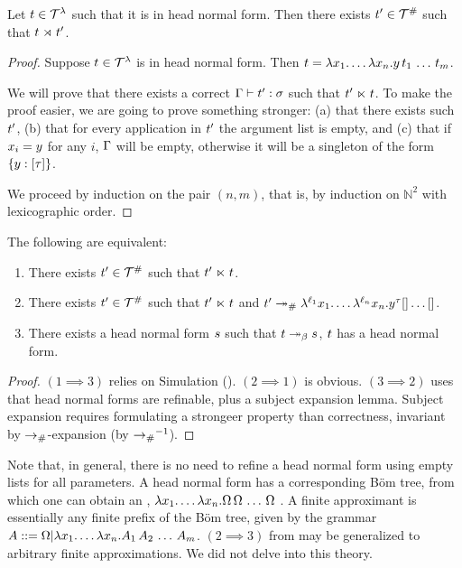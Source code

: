 \begin{lemma}
Let $t \in \mathcal{T}^{\lambda}$ such that it is in head normal form.
 Then there exists $t' \in \mathcal{T}^{\mathtt{\#}}$ such that $t \mathrel{\rtimes} t'$.
\end{lemma}
\begin{proof}
Suppose $t \in \mathcal{T}^{\lambda}$ is in head normal form.
Then $t = \lambda x_1. \hdots\lambda x_n. y\,t_1\,\hdots\,t_m$.

We will prove that there exists a correct $\Gamma \vdash t' : \sigma$ such that $t' \mathrel{\ltimes} t$.
To make the proof easier, we are going to prove something stronger:
  (a) that there exists such $t'$,
  (b) that for every application in $t'$ the argument list is empty, and
  (c) that if $x_i = y$ for any $i$, $\Gamma$ will be empty,
      otherwise it will be a singleton of the form $\{y : [\tau]\}$.

We proceed by induction on the pair $(n, m)$, that is, by induction on
  $\mathbb{N}^2$ with lexicographic order.
\end{proof}

\begin{proposition}
The following are equivalent:
\begin{enumerate}
  \item There exists $t' \in \mathcal{T}^{\mathtt{\#}}$ such that $t' \mathrel{\ltimes} t$.
  \item There exists $t' \in \mathcal{T}^{\mathtt{\#}}$ such that $t' \mathrel{\ltimes} t$
    and $t' \mathrel{\mathrel{\twoheadrightarrow}_{\mathtt{\#}}}
         \lambda^{\ell_1} x_1. \hdots \lambda^{\ell_n} x_n. y^\tau{[] \hdots []}$.
  \item There exists a head normal form $s$ such that $t \mathrel{\twoheadrightarrow}_\beta s$, \ie
    $t$ has a head normal form.
\end{enumerate}
\end{proposition}
\begin{proof}
$(1 \implies 3)$ relies on Simulation ().
$(2 \implies 1)$ is obvious.
$(3 \implies 2)$ uses that head normal forms are refinable, plus a subject expansion lemma.
Subject expansion requires formulating a strongeer property than correctness,
invariant by $\mathrel{\to_{\mathtt{\#}}}$-expansion (\ie by $\mathrel{\to_{\mathtt{\#}}}^{-1}$).
\end{proof}


Note that, in general, there is no need to refine a head normal form using empty lists for
all parameters.
A head normal form has a corresponding B\"om tree, from which one
can obtain an ,
$\lambda x_1. \hdots\lambda x_n. \Omega\,\Omega\,\hdots\,\Omega$
\cite{Barendregt:1984,dezani-ciancaglini-bohm-approximant}.
A finite approximant is essentially any finite prefix of the B\"om tree, given by the grammar
$A ::= \Omega |\lambda x_1. \hdots\lambda x_n. A_1\,A_2\,\hdots\,A_m$.
$(2 \implies 3)$ from  may be generalized to arbitrary
finite approximations. We did not delve into this theory.



